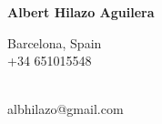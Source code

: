 \noindent
\textbf{\LARGE Albert Hilazo Aguilera}
\medskip

\begin{multicols}{3}
\noindent
Barcelona, Spain \\
+34 651015548

\noindent
\href{http://albhilazo.com}{} \\
albhilazo@gmail.com

\noindent
\href{http://linkedin.com/in/albhilazo}{} \\
\href{http://github.com/albhilazo}{}
\end{multicols}
